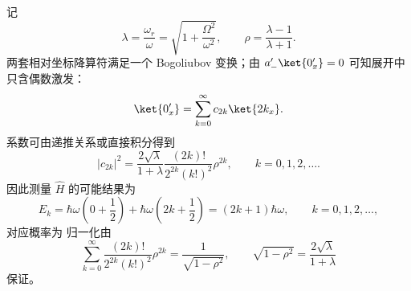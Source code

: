 \begin{question}[共 30 分]
\begin{solution}
\begin{enumerate}
  记
  \[
  \lambda=\frac{\omega_r}{\omega}=\sqrt{1+\frac{\Omega^2}{\omega^2}},
  \qquad
  \rho=\frac{\lambda-1}{\lambda+1}.
  \]
  两套相对坐标降算符满足一个 Bogoliubov 变换；由 $a'_-\ket{0'_x}=0$ 可知展开中只含偶数激发：
  \[
  \ket{0'_x}=\sum_{k=0}^{\infty}c_{2k}\ket{2k_x}.
  \]
  系数可由递推关系或直接积分得到
  \[
  |c_{2k}|^2=\frac{2\sqrt\lambda}{1+\lambda}\frac{(2k)!}{2^{2k}(k!)^2}\rho^{2k},
  \qquad k=0,1,2,\dots .
  \]
  因此测量 $\hat H$ 的可能结果为
  \[
  E_k=\hbar\omega\left(0+\frac12\right)+\hbar\omega\left(2k+\frac12\right)=(2k+1)\hbar\omega,
  \qquad k=0,1,2,\dots,
  \]
  对应概率为
  归一化由
  \[
  \sum_{k=0}^\infty \frac{(2k)!}{2^{2k}(k!)^2}\rho^{2k}=\frac{1}{\sqrt{1-\rho^2}},
  \qquad
  \sqrt{1-\rho^2}=\frac{2\sqrt\lambda}{1+\lambda}
  \]
  保证。
\end{enumerate}
\end{solution}
\end{question}
